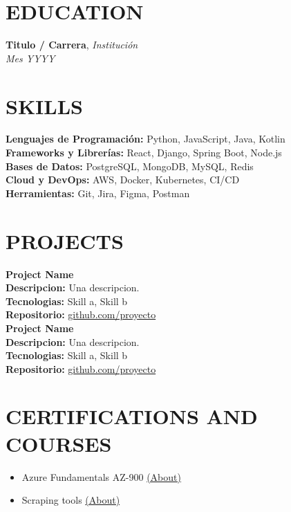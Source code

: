 \documentclass[11pt,a4paper]{article}
\begin{document}
\section*{EDUCATION}
\textbf{Titulo / Carrera}, \textit{Institución}\\
\textit{Mes YYYY}

\section*{SKILLS}
\textbf{Lenguajes de Programación:} Python, JavaScript, Java, Kotlin\\
\textbf{Frameworks y Librerías:} React, Django, Spring Boot, Node.js\\
\textbf{Bases de Datos:} PostgreSQL, MongoDB, MySQL, Redis\\
\textbf{Cloud y DevOps:} AWS, Docker, Kubernetes, CI/CD\\
\textbf{Herramientas:} Git, Jira, Figma, Postman

\section*{PROJECTS}
\textbf{Project Name}\\
\textbf{Descripcion:} Una descripcion.\\
\textbf{Tecnologias:} Skill a, Skill b\\
\textbf{Repositorio:} \href{https://github.com/proyecto}{github.com/proyecto}
\vspace{8pt}\\
\textbf{Project Name}\\
\textbf{Descripcion:} Una descripcion.\\
\textbf{Tecnologias:} Skill a, Skill b\\
\textbf{Repositorio:} \href{https://github.com/proyecto}{github.com/proyecto}

\section*{CERTIFICATIONS AND COURSES}
\begin{itemize}[leftmargin=1.2em]
    \item Azure Fundamentals AZ-900 \href{https://learn.microsoft.com/es-es/credentials/certifications/azure-fundamentals/?practice-assessment-type=certification}{(About)}
    \item Scraping tools \href{https://udemy.com/a-course}{(About)}
\end{itemize}
\end{document}
